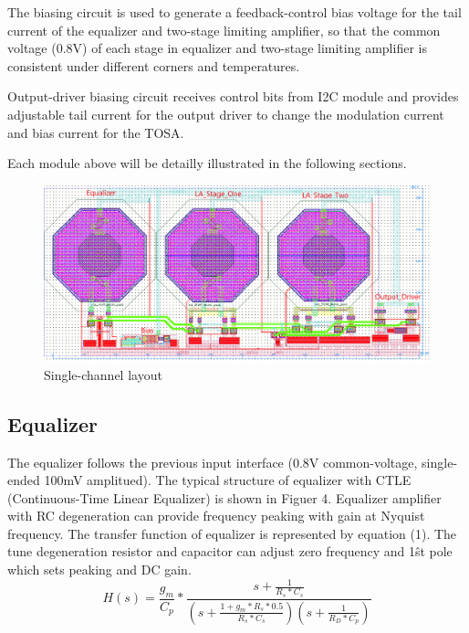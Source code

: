 \documentclass[11pt,a4paper]{article}
\begin{document}
\begin{spacing}{1.25}
The biasing circuit is used to generate a feedback-control bias voltage for the tail current of the equalizer and two-stage limiting amplifier, so that the common voltage (0.8V) of each stage in equalizer and two-stage limiting amplifier is consistent under different corners and temperatures.

Output-driver biasing circuit receives control bits from I2C module and provides adjustable tail current for the output driver to change the modulation current and bias current for the TOSA.

Each module above will be detailly illustrated in the following sections.
\begin{figure}[H]
    \includegraphics[width=\linewidth]{./Img/Layout_Eq_LA_OD_Background.png}
    \caption{Single-channel layout}
\end{figure}

\subsection{Equalizer}

The equalizer follows the previous input interface (0.8V common-voltage, single-ended 100mV amplitued). The typical structure of equalizer with CTLE (Continuous-Time Linear Equalizer)\cite{equalizer} is shown in Figuer 4. Equalizer amplifier with RC degeneration can provide frequency peaking with gain at Nyquist frequency. The transfer function of equalizer is represented by equation (1). The tune degeneration resistor and capacitor can adjust zero frequency and 1\^{st} pole which sets peaking and DC gain.
\begin{equation}
H(s) = \frac{g_m}{C_p} * \frac{s + \frac{1}{R_s * C_s}}{\left(s + \frac{1 + g_m * R_s * 0.5}{R_s * C_s}\right)\left(s + \frac{1}{R_D * C_p}\right)} \tag{1} 
\end{equation}


\end{spacing}
\end{document}
